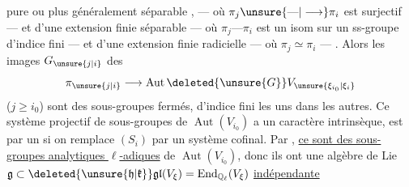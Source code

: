 pure ou plus généralement séparable , --- où $\pi_j\unsure{\text{---}|\longrightarrow}\pi_i$ est surjectif --- et d'une extension finie séparable --- où $\pi_j\text{---}\pi_i$ est un isom sur un ss-groupe d'indice fini --- et d'une extension finie radicielle --- où $\pi_j\simeq\pi_i$ --- . Alors les images $G_{\unsure{j|i}}$ des
\[
\pi_{\unsure{j|i}}\longrightarrow\operatorname{Aut}\deleted{\unsure{G}}V_{\unsure{\xi_{i_0}|\xi_i}}
\]
($j\geq i_0$) sont des sous-groupes fermés,  d'indice fini les uns dans les autres. Ce système projectif de sous-groupes de $\operatorname{Aut}(V_{i_0})$  a un caractère intrinsèque, est  par un  si on remplace $(S_i)$ par un système cofinal. Par , \uline{ce sont des sous-groupes analytiques $\ell$-adiques} de $\operatorname{Aut}(V_{i_0})$, donc ils ont une algèbre de Lie $\mathfrak g\subset\deleted{\unsure{\mathfrak h|\mathfrak k}}\mathfrak{gl}(V_\xi)=\operatorname{End}_{\mathbb Q_\ell}(V_\xi)$ \uline{indépendante}
